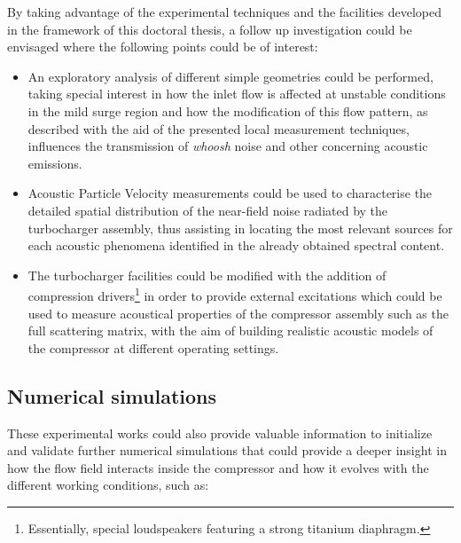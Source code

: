 By taking advantage of the experimental techniques and the facilities developed in the framework of this doctoral thesis, a follow up investigation could be envisaged where the following points could be of interest:

\begin{itemize}
	\item An exploratory analysis of different simple geometries could be performed, taking special interest in how the inlet flow is affected at unstable conditions in the mild surge region and how the modification of this flow pattern, as described with the aid of the presented local measurement techniques, influences the transmission of \emph{whoosh} noise and other concerning acoustic emissions.

	\item Acoustic Particle Velocity measurements could be used to characterise the detailed spatial distribution of the near-field noise radiated by the turbocharger assembly, thus assisting in locating the most relevant sources for each acoustic phenomena identified in the already obtained spectral content.

	\item The turbocharger facilities could be modified with the addition of compression drivers\footnote{Essentially, special loudspeakers featuring a strong titanium diaphragm.} in order to provide external excitations which could be used to measure acoustical properties of the compressor assembly such as the full scattering matrix, with the aim of building realistic acoustic models of the compressor at different operating settings.
\end{itemize}

\subsection{Numerical simulations}

These experimental works could also provide valuable information to initialize and validate further numerical simulations that could provide a deeper insight in how the flow field interacts inside the compressor and how it evolves with the different working conditions, such as:


